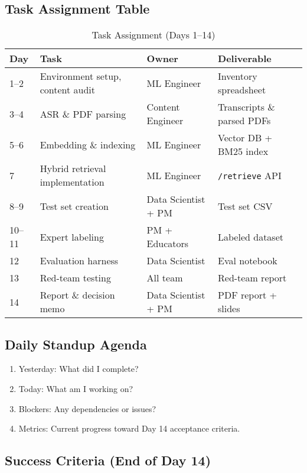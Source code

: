 \documentclass[11pt,letterpaper]{article}
\begin{document}
\subsection{Task Assignment Table}

\begin{table}[H]
\centering
\small
\begin{tabular}{@{}p{2cm}p{5cm}p{3cm}p{3cm}@{}}
\toprule
\textbf{Day} & \textbf{Task} & \textbf{Owner} & \textbf{Deliverable} \\
\midrule
1--2 & Environment setup, content audit & ML Engineer & Inventory spreadsheet \\
3--4 & ASR \& PDF parsing & Content Engineer & Transcripts \& parsed PDFs \\
5--6 & Embedding \& indexing & ML Engineer & Vector DB + BM25 index \\
7 & Hybrid retrieval implementation & ML Engineer & \texttt{/retrieve} API \\
8--9 & Test set creation & Data Scientist + PM & Test set CSV \\
10--11 & Expert labeling & PM + Educators & Labeled dataset \\
12 & Evaluation harness & Data Scientist & Eval notebook \\
13 & Red-team testing & All team & Red-team report \\
14 & Report \& decision memo & Data Scientist + PM & PDF report + slides \\
\bottomrule
\end{tabular}
\caption{Task Assignment (Days 1--14)}
\end{table}

\subsection{Daily Standup Agenda}

\begin{enumerate}
\item Yesterday: What did I complete?
\item Today: What am I working on?
\item Blockers: Any dependencies or issues?
\item Metrics: Current progress toward Day 14 acceptance criteria.
\end{enumerate}

\subsection{Success Criteria (End of Day 14)}
\end{document}
